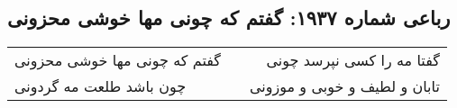 \begin{center}
\section*{رباعی شماره ۱۹۳۷: گفتم که چونی مها خوشی محزونی}
\label{sec:1937}
\begin{longtable}{l p{0.5cm} r}
گفتم که چونی مها خوشی محزونی
&&
گفتا مه را کسی نپرسد چونی
\\
چون باشد طلعت مه گردونی
&&
تابان و لطیف و خوبی و موزونی
\\
\end{longtable}
\end{center}
